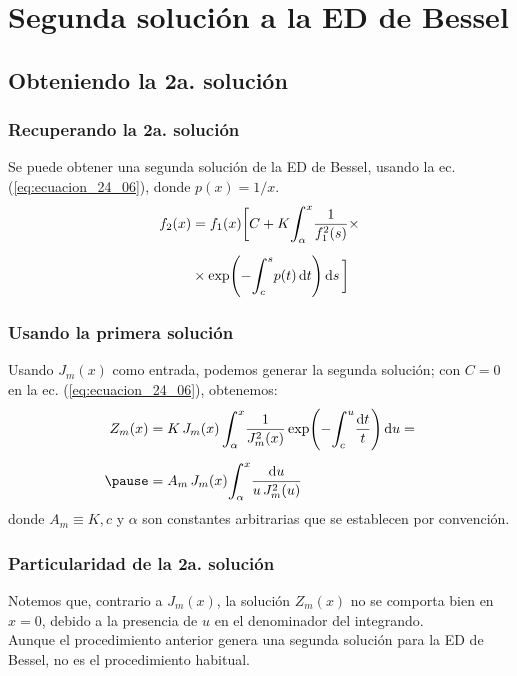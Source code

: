 \documentclass[12pt]{beamer}
\begin{document}
\section{Segunda solución a la ED de Bessel}
\subsection{Obteniendo la 2a. solución}

\begin{frame}
\frametitle{Recuperando la 2a. solución}
Se puede obtener una segunda solución de la ED de Bessel, usando la ec. (\ref{eq:ecuacion_24_06}), donde $p(x) = 1/x$.\pause
\begin{eqnarray}
\begin{aligned}
f_{2}(x) &=  f_{1}(x) \bigg[ C + K \scaleint{6ex}_{\bs \alpha}^{x} \dfrac{1}{f_{1}^{2} (s)}  \times \\[0.5em]
&\times \exp( - \scaleint{6ex}_{\bs c}^{s} p(t) \dd{t}) \dd{s} \bigg]
\end{aligned}
\label{eq:ecuacion_24_06}
\end{eqnarray}
\end{frame}
\begin{frame}
\frametitle{Usando la primera solución}
Usando $J_{m}(x)$ como entrada, podemos generar la segunda solución; con $C = 0$ en la ec. (\ref{eq:ecuacion_24_06}), obtenemos:
\pause
\begin{eqnarray*}
\begin{aligned}
Z_{m}(x) &= K \, J_{m}(x) \, \scaleint{6ex}_{\bs \alpha}^{x} \dfrac{1}{J_{m}^{2}(x)} \exp(- \scaleint{6ex}_{\bs c}^{u} \dfrac{\dd{t}}{t}) \dd{u} = \\[0.5em] \pause
&= A_{m} \, J_{m}(x) \scaleint{6ex}_{\bs \alpha}^{x} \dfrac{\dd{u}}{u \, J_{m}^{2}(u)}
\end{aligned}
\end{eqnarray*}
\pause
donde $A_{m} \equiv K , c$ y $\alpha$ son constantes arbitrarias que se establecen por convención.
\end{frame}
\begin{frame}
\frametitle{Particularidad de la 2a. solución}
Notemos que, contrario a $J_{m}(x)$, la solución $Z_{m}(x)$ no se comporta bien en $x = 0$, debido a la presencia de $u$ en el denominador del integrando.
\\
\bigskip
\pause
Aunque el procedimiento anterior genera una segunda solución para la ED de Bessel, no es el procedimiento habitual.
\end{frame}
\end{document}
